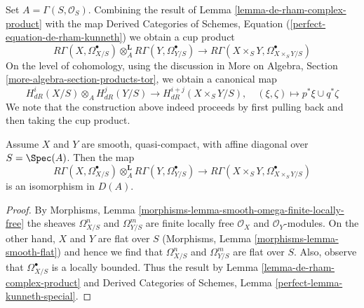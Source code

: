 \noindent
Set $A = \Gamma(S, \mathcal{O}_S)$. Combining the result of
Lemma \ref{lemma-de-rham-complex-product} with the map
Derived Categories of Schemes, Equation
(\ref{perfect-equation-de-rham-kunneth})
we obtain a cup product
$$
R\Gamma(X, \Omega^\bullet_{X/S})
\otimes_A^\mathbf{L}
R\Gamma(Y, \Omega^\bullet_{Y/S})
\longrightarrow
R\Gamma(X \times_S Y, \Omega^\bullet_{X \times_S Y/S})
$$
On the level of cohomology, using the discussion in
More on Algebra, Section \ref{more-algebra-section-products-tor},
we obtain a canonical map
$$
H^i_{dR}(X/S) \otimes_A H^j_{dR}(Y/S)
\longrightarrow
H^{i + j}_{dR}(X \times_S Y/S),\quad
(\xi, \zeta) \longmapsto p^*\xi \cup q^*\zeta
$$
We note that the construction above indeed proceeds by
first pulling back and then taking the cup product.

\begin{lemma}
\label{lemma-kunneth-de-rham}
Assume $X$ and $Y$ are smooth, quasi-compact, with affine diagonal over
$S = \Spec(A)$. Then the map
$$
R\Gamma(X, \Omega^\bullet_{X/S})
\otimes_A^\mathbf{L}
R\Gamma(Y, \Omega^\bullet_{Y/S})
\longrightarrow
R\Gamma(X \times_S Y, \Omega^\bullet_{X \times_S Y/S})
$$
is an isomorphism in $D(A)$.
\end{lemma}

\begin{proof}
By Morphisms, Lemma \ref{morphisms-lemma-smooth-omega-finite-locally-free}
the sheaves $\Omega^n_{X/S}$ and $\Omega^m_{Y/S}$ are finite locally free
$\mathcal{O}_X$ and $\mathcal{O}_Y$-modules. On the other hand, $X$ and $Y$
are flat over $S$ (Morphisms, Lemma \ref{morphisms-lemma-smooth-flat})
and hence we find that $\Omega^n_{X/S}$ and $\Omega^m_{Y/S}$ are flat over $S$.
Also, observe that $\Omega^\bullet_{X/S}$ is a locally bounded. Thus
the result by Lemma \ref{lemma-de-rham-complex-product} and
Derived Categories of Schemes, Lemma \ref{perfect-lemma-kunneth-special}.
\end{proof}

